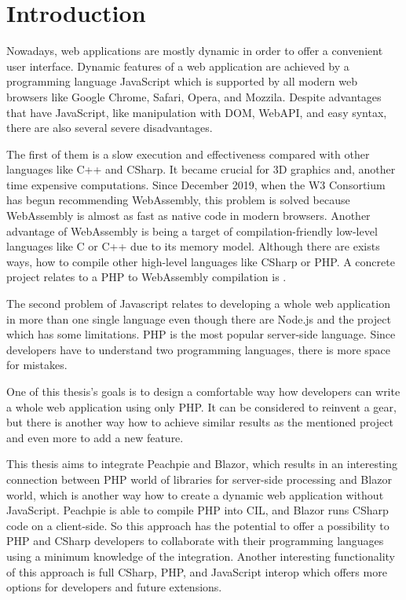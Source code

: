 \chapter*{Introduction}

Nowadays, web applications are mostly dynamic in order to offer a convenient user interface.
Dynamic features of a web application are achieved by a programming language JavaScript which is supported by all modern web browsers like Google Chrome, Safari, Opera, and Mozzila.
Despite advantages that have JavaScript, like manipulation with DOM, WebAPI, and easy syntax, there are also several severe disadvantages.

The first of them is a slow execution and effectiveness compared with other languages like C++ and CSharp.
It became crucial for 3D graphics and, another time expensive computations.
Since December 2019, when the W3 Consortium has begun recommending WebAssembly, this problem is solved because WebAssembly is almost as fast as native code in modern browsers.
Another advantage of WebAssembly is being a target of compilation-friendly low-level languages like C or C++ due to its memory model.
Although there are exists ways, how to compile other high-level languages like CSharp or PHP.
A concrete project relates to a PHP to WebAssembly compilation is \cite{Pib}.

The second problem of Javascript relates to developing a whole web application in more than one single language even though there are Node.js and the project \cite{Pib} which has some limitations.
PHP is the most popular server-side language.
Since developers have to understand two programming languages, there is more space for mistakes.

One of this thesis's goals is to design a comfortable way how developers can write a whole web application using only PHP.
It can be considered to reinvent a gear, but there is another way how to achieve similar results as the mentioned project and even more to add a new feature.

This thesis aims to integrate Peachpie and Blazor, which results in an interesting connection between PHP world of libraries for server-side processing and Blazor world, which is another way how to create a dynamic web application without JavaScript.
Peachpie is able to compile PHP into CIL, and Blazor runs CSharp code on a client-side.
So this approach has the potential to offer a possibility to PHP and CSharp developers to collaborate with their programming languages using a minimum knowledge of the integration. 
Another interesting functionality of this approach is full CSharp, PHP, and JavaScript interop which offers more options for developers and future extensions.

